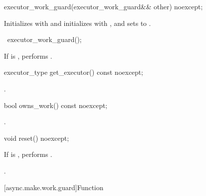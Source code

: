 %
\begin{itemdecl}
executor_work_guard(executor_work_guard&& other) noexcept;
\end{itemdecl}

\begin{itemdescr}
\pnum
\effects Initializes  with 
and initializes  with ,
and sets  to .
\end{itemdescr}

%
\begin{itemdecl}
~executor_work_guard();
\end{itemdecl}

\begin{itemdescr}
\pnum
\effects If  is , performs .
\end{itemdescr}

%
\begin{itemdecl}
executor_type get_executor() const noexcept;
\end{itemdecl}

\begin{itemdescr}
\pnum
\returns {}.
\end{itemdescr}

%
\begin{itemdecl}
bool owns_work() const noexcept;
\end{itemdecl}

\begin{itemdescr}
\pnum
\returns {}.
\end{itemdescr}

%
\begin{itemdecl}
void reset() noexcept;
\end{itemdecl}

\begin{itemdescr}
\pnum
\effects If  is , performs .

\pnum
\postconditions {}.
\end{itemdescr}




[async.make.work.guard]{Function }

